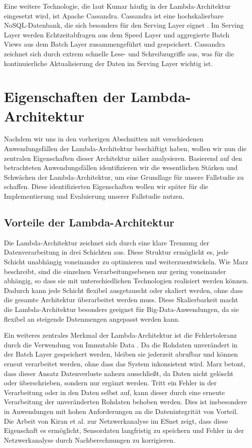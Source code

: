 Eine weitere Technologie, die laut Kumar \cite{kumar2020lambda} häufig in der Lambda-Architektur eingesetzt wird, ist Apache Cassandra. Cassandra ist eine hochskalierbare NoSQL-Datenbank, die sich besonders für den Serving Layer eignet \cite{warren2015big}. Im Serving Layer werden Echtzeitabfragen aus dem Speed Layer und aggregierte Batch Views aus dem Batch Layer zusammengeführt und gespeichert. Cassandra zeichnet sich durch extrem schnelle Lese- und Schreibzugriffe aus, was für die kontinuierliche Aktualisierung der Daten im Serving Layer wichtig ist.

\section{Eigenschaften der Lambda-Architektur}
Nachdem wir uns in den vorherigen Abschnitten mit verschiedenen Anwendungsfällen der Lambda-Architektur beschäftigt haben, wollen wir nun die zentralen Eigenschaften dieser Architektur näher analysieren. Basierend auf den betrachteten Anwendungsfällen identifizieren wir die wesentlichen Stärken und Schwächen der Lambda-Architektur, um eine Grundlage für unsere Fallstudie zu schaffen. Diese identifizierten Eigenschaften wollen wir später für die Implementierung und Evaluierung unserer Fallstudie nutzen.

\subsection{Vorteile der Lambda-Architektur}
Die Lambda-Architektur zeichnet sich durch eine klare Trennung der Datenverarbeitung in drei Schichten aus. Diese Struktur ermöglicht es, jede Schicht unabhängig voneinander zu optimieren und weiterzuentwickeln. Wie Marz \cite{warren2015big} beschreibt, sind die einzelnen Verarbeitungsebenen nur gering voneinander abhängig, so dass sie mit unterschiedlichen Technologien realisiert werden können. Dadurch kann jede Schicht flexibel ausgetauscht oder skaliert werden, ohne dass die gesamte Architektur überarbeitet werden muss. Diese Skalierbarkeit macht die Lambda-Architektur besonders geeignet für Big-Data-Anwendungen, da sie flexibel an steigende Datenmengen angepasst werden kann.

Ein weiteres zentrales Merkmal der Lambda-Architektur ist die Fehlertoleranz durch die Verwendung von Immutable Data \cite{warren2015big}. Da die Rohdaten unverändert in der Batch Layer gespeichert werden, bleiben sie jederzeit abrufbar und können erneut verarbeitet werden, ohne dass das System inkonsistent wird. Marz \cite{warren2015big} betont, dass dieser Ansatz Datenverluste nahezu ausschließt, da Daten nicht gelöscht oder überschrieben, sondern nur ergänzt werden. Tritt ein Fehler in der Verarbeitung oder in den Daten selbst auf, kann dieser durch eine erneute Verarbeitung der unveränderten Rohdaten behoben werden. Dies ist insbesondere in Anwendungen mit hohen Anforderungen an die Datenintegrität von Vorteil. Die Arbeit von Kiran et al. \cite{kiran2015lambda} zur Netzwerkanalyse im ESnet zeigt, dass diese Eigenschaft es ermöglicht, Sensordaten langfristig zu speichern und Fehler in der Netzwerkanalyse durch Nachberechnungen zu korrigieren.

